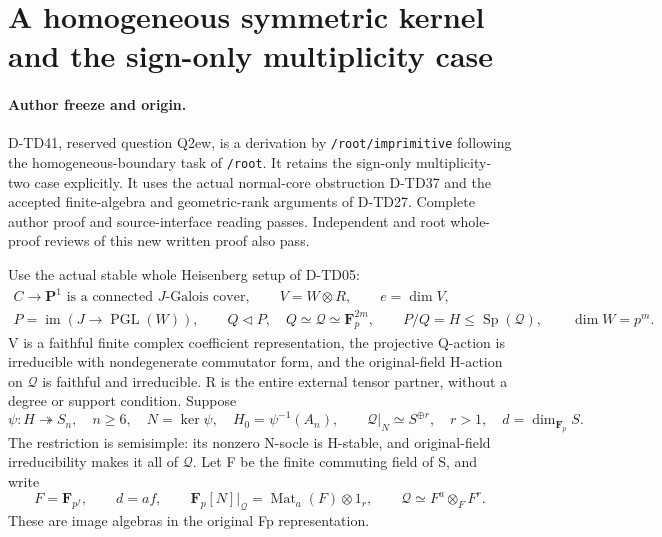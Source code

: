 \section{A homogeneous symmetric kernel and the sign-only multiplicity case}
\label{sec:heisenberg-homogeneous-symmetric}

\paragraph{Author freeze and origin.}
D-TD41, reserved question Q2ew, is a derivation by
\texttt{/root/imprimitive} following the homogeneous-boundary task
of \texttt{/root}.  It retains the sign-only multiplicity-two
case explicitly.  It uses the actual normal-core obstruction
D-TD37 and the accepted finite-algebra and geometric-rank
arguments of D-TD27.  Complete author proof and source-interface
reading passes.  Independent and root whole-proof reviews of this new
written proof also pass.

Use the actual stable whole Heisenberg setup of D-TD05:
\[
 \begin{gathered}
 C\longrightarrow\mathbf P^1\text{ is a connected }J\text{-Galois cover},
 \qquad V=W\otimes R,\qquad e=\dim V,\\
 P=\operatorname{im}(J\to\operatorname{PGL}(W)),\qquad
 Q\triangleleft P,\quad Q\simeq\mathcal Q\simeq\mathbf F_p^{2m},
 \qquad P/Q=H\le\operatorname{Sp}(\mathcal Q),\qquad \dim W=p^m.
 \end{gathered}
 \tag{HSM.1}
\]
V is a faithful finite complex coefficient representation, the
projective Q-action is irreducible with nondegenerate commutator
form, and the original-field H-action on \(\mathcal Q\) is
faithful and irreducible.  R is the entire external tensor
partner, without a degree or support condition.  Suppose
\[
 \psi:H\twoheadrightarrow S_n,\quad n\ge6,\quad
 N=\ker\psi,\quad H_0=\psi^{-1}(A_n),\qquad
 \mathcal Q\big|_N\simeq S^{\oplus r},\quad r>1,
 \quad d=\dim_{\mathbf F_p}S.
 \tag{HSM.2}
\]
The restriction is semisimple: its nonzero N-socle is H-stable,
and original-field irreducibility makes it all of \(\mathcal Q\).
Let F be the finite commuting field of S, and write
\[
 F=\mathbf F_{p^f},\qquad d=af,\qquad
 \mathbf F_p[N]\big|_{\mathcal Q}
     =\operatorname{Mat}_a(F)\otimes1_r,
 \qquad \mathcal Q\simeq F^a\otimes_F F^r.
 \tag{HSM.3}
\]
These are image algebras in the original Fp representation.


